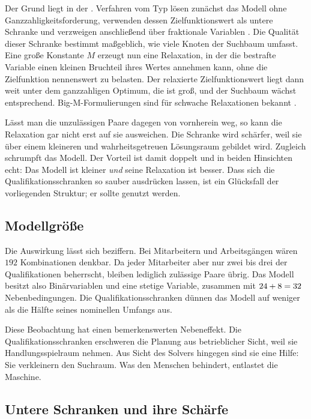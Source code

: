 Der Grund liegt in der . Verfahren vom Typ
 lösen zunächst das Modell ohne
Ganzzahligkeitsforderung, verwenden dessen Zielfunktionswert als untere Schranke
und verzweigen anschließend über fraktionale Variablen
\parencite{land1960automatic,nemhauser1988integer}. Die Qualität dieser Schranke
bestimmt maßgeblich, wie viele Knoten der Suchbaum umfasst. Eine große Konstante
$M$ erzeugt nun eine Relaxation, in der die bestrafte Variable einen kleinen
Bruchteil ihres Wertes annehmen kann, ohne die Zielfunktion nennenswert zu
belasten. Der relaxierte Zielfunktionswert liegt dann weit unter dem
ganzzahligen Optimum, die  ist groß, und der Suchbaum
wächst entsprechend. Big-M-Formulierungen sind für schwache Relaxationen
bekannt \parencite{wolsey2020integer}.

Lässt man die unzulässigen Paare dagegen von vornherein weg, so kann die
Relaxation gar nicht erst auf sie ausweichen. Die Schranke wird schärfer, weil
sie über einem kleineren und wahrheitsgetreuen Lösungsraum gebildet wird.
Zugleich schrumpft das Modell. Der Vorteil ist damit doppelt und in beiden
Hinsichten echt: Das Modell ist kleiner \emph{und} seine Relaxation ist besser.
Dass sich die Qualifikationsschranken so sauber ausdrücken lassen, ist ein
Glücksfall der vorliegenden Struktur; er sollte genutzt werden.

\subsection*{Modellgröße}

Die Auswirkung lässt sich beziffern. Bei \ZahlMitarbeiter{} Mitarbeitern und
\ZahlAufgaben{} Arbeitsgängen wären $192$ Kombinationen denkbar. Da jeder
Mitarbeiter aber nur zwei bis drei der \ZahlQualifikationen{} Qualifikationen
beherrscht, bleiben lediglich \ZahlPaare{} zulässige Paare übrig. Das Modell
besitzt also \ZahlPaare{} Binärvariablen und eine stetige Variable, zusammen mit
$24{} + 8{} = 32$ Nebenbedingungen. Die
Qualifikationsschranken dünnen das Modell auf weniger als die Hälfte seines
nominellen Umfangs aus.

Diese Beobachtung hat einen bemerkenswerten Nebeneffekt. Die
Qualifikationsschranken erschweren die Planung aus betrieblicher Sicht, weil sie
Handlungsspielraum nehmen. Aus Sicht des Solvers hingegen sind sie eine Hilfe:
Sie verkleinern den Suchraum. Was den Menschen behindert, entlastet die
Maschine.

\subsection*{Untere Schranken und ihre Schärfe}

